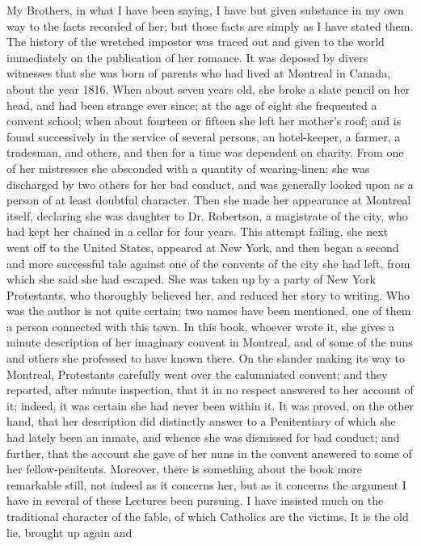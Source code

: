 My Brothers, in what I have been saying, I have but
given substance in my own way to the facts recorded of
her; but those facts are simply as I have stated them.
The history of the wretched impostor was traced out and
given to the world immediately on the publication of her
romance. It was deposed by divers witnesses that she was
born of parents who had lived at Montreal in Canada,
about the year 1816. When about seven years old, she
broke a slate pencil on her head, and had been strange
ever since; at the age of eight she frequented a convent
school; when about fourteen or fifteen she left her
mother's roof; and is found successively in the service
of several persons, an hotel-keeper, a farmer, a
tradesman, and others, and then for a time was dependent
on charity. From one of her mistresses she absconded with
a quantity of wearing-linen; she was discharged by two
others for her bad conduct, and was generally looked upon
as a person of at least doubtful character. Then she made
her appearance at Montreal itself, declaring she was
daughter to Dr. Robertson, a magistrate of the city, who
had kept her chained in a cellar for four years. This
attempt failing, she next went off to the United States,
appeared at New York, and then began a second and more
successful tale against one of the convents of the city
she had left, from which she said she had escaped. She
was taken up by a party of New York Protestants, who
thoroughly believed her, and reduced her story to
writing. Who was the author is not quite certain; two
names have been mentioned, one of them a person connected
with this town. In this book, whoever wrote it, she gives
a minute description of her imaginary convent in
Montreal, and of some of the nuns and others she
professed to have known there. On the slander making its
way to Montreal, Protestants carefully went over the
calumniated convent; and they reported, after minute
inspection, that it in no respect answered to her account
of it; indeed, it was certain she had never been within
it. It was proved, on the other hand, that her
description did distinctly answer to a Penitentiary of
which she had lately been an inmate, and whence she was
dismissed for bad conduct; and further, that the account
she gave of her nuns in the convent answered to some of
her fellow-penitents. Moreover, there is something about
the book more remarkable still, not indeed as it concerns
her, but as it concerns the argument I have in several of
these Lectures been pursuing. I have insisted much on the
traditional character of the fable, of which Catholics
are the victims. It is the old lie, brought up again and
